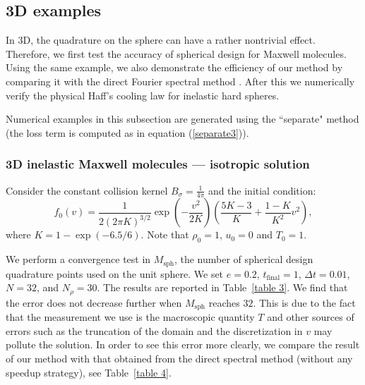\documentclass[review,times]{elsarticle}
\begin{document}
\subsection{3D examples}

In 3D, the quadrature on the sphere can have a rather nontrivial effect. Therefore, we first test the accuracy of spherical design for Maxwell molecules. Using the same example, we also demonstrate the efficiency of our method by comparing it with the direct Fourier spectral method \cite{FPT05}. After this we numerically verify the physical Haff's cooling law for inelastic hard spheres.

Numerical examples in this subsection are generated using the ``separate" method (the loss term is computed as in equation (\ref{separate3})).

\subsubsection{3D inelastic Maxwell molecules \color{red} --- isotropic solution}

Consider the constant collision kernel $B_{\sigma} = \frac{1}{4\pi}$ and the initial condition:
\begin{equation}\label{3Dbkw}
  f_0(v) = \frac{1}{2(2\pi K)^{3/2}}\exp\left(-\frac{v^2}{2K}\right)\left(\frac{5K-3}{K}+\frac{1-K}{K^2}v^2\right),
\end{equation}
where $K = 1 - \exp(-6.5/6)$. Note that $\rho_0=1$, $u_0=0$ and $T_0=1$.

We perform a convergence test in $M_{\text{sph}}$, the number of spherical design quadrature points used on the unit sphere. We set $e=0.2$, $t_\text{final} = 1$, $\Delta t = 0.01$, $N = 32$, and $N_{\rho}=30$. The results are reported in Table~\ref{table 3}. We find that the error does not decrease further when $M_{\text{sph}}$ reaches $32$. This is due to the fact that the measurement we use is the macroscopic quantity $T$ and other sources of errors such as the truncation of the domain and the discretization in $v$ may pollute the solution. In order to see this error more clearly, we compare the result of our method with that obtained from the direct spectral method (without any speedup strategy), see Table~\ref{table 4}.
\end{document}
